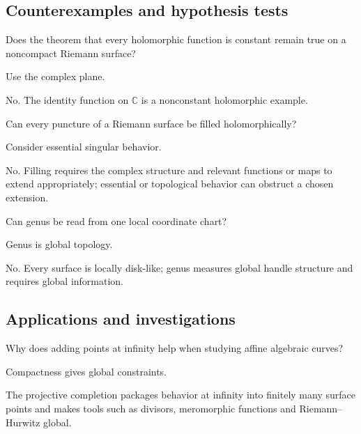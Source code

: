 \subsection*{Counterexamples and hypothesis tests}

\begin{exercise}\label{exr:iv26-expand-10}
Does the theorem that every holomorphic function is constant remain true on a noncompact Riemann surface?
\end{exercise}
\begin{hint}
Use the complex plane.
\end{hint}
\begin{solution}
No. The identity function on \(\mathbb C\) is a nonconstant holomorphic example.
\end{solution}

\begin{exercise}\label{exr:iv26-expand-11}
Can every puncture of a Riemann surface be filled holomorphically?
\end{exercise}
\begin{hint}
Consider essential singular behavior.
\end{hint}
\begin{solution}
No. Filling requires the complex structure and relevant functions or maps to extend appropriately; essential or topological behavior can obstruct a chosen extension.
\end{solution}

\begin{exercise}\label{exr:iv26-expand-12}
Can genus be read from one local coordinate chart?
\end{exercise}
\begin{hint}
Genus is global topology.
\end{hint}
\begin{solution}
No. Every surface is locally disk-like; genus measures global handle structure and requires global information.
\end{solution}

\subsection*{Applications and investigations}

\begin{exercise}\label{exr:iv26-expand-13}
Why does adding points at infinity help when studying affine algebraic curves?
\end{exercise}
\begin{hint}
Compactness gives global constraints.
\end{hint}
\begin{solution}
The projective completion packages behavior at infinity into finitely many surface points and makes tools such as divisors, meromorphic functions and Riemann--Hurwitz global.
\end{solution}

